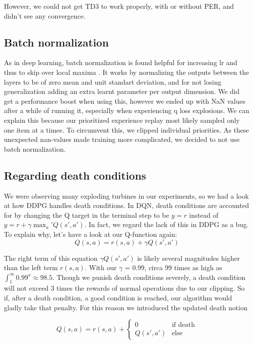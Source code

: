 \documentclass[hyperref,beleg]{cgvpub}
\begin{document}
However, we could not get \ac{TD3} to work properly, with or without \ac{PER}, and didn't see any convergence.

\subsection{Batch normalization}
As in deep learning, batch normalization is found helpful for increasing lr and thus to skip over local maxima \cite{bjorckUnderstandingBatchNormalization}. It works by normalizing the outputs between the layers to be of zero mean and unit standart deviation, and for not losing generalization adding an extra learnt parameter per output dimension. We did get a performance boost when using this, however we ended up with NaN values after a while of running it, especially when experiencing q loss explosions. We can explain this because our prioritized experience replay most likely sampled only one item at a timee. To circumvent this, we clipped individual priorities. As these unexpected nan-values made training more complicated, we decided to not use batch normalization.

\subsection{Regarding death conditions}
\label{sec:death}

We were observing many exploding turbines in our experiments, so we had a look at how \ac{DDPG} handles death conditions. In \ac{DQN}, death conditions are accounted for by changing the Q target in the terminal step to be $y = r$ instead of $y = r + \gamma \max_a' Q(s', a')$. In fact, we regard the lack of this in \ac{DDPG} as a bug. To explain why, let's have a look at our Q-function again:
\begin{equation}
Q(s,a) = r(s,a) + \gamma Q(s', a')
\end{equation}

The right term of this equation $\gamma Q(s', a')$ is likely several magnitudes higher than the left term $r(s,a)$. With our $\gamma$ = 0.99, circa 99 times as high as $\int_1^{\infty} 0.99^x \approx 98.5$. Though we punish death conditions severely, a death condition will not exceed 3 times the rewards of normal operations due to our clipping. So if, after a death condition, a good condition is reached, our algorithm would gladly take that penalty. For this reason we introduced the updated death notion

\begin{equation}
Q(s,a) = r(s,a) + \begin{cases} 0& \text{if death}\\ Q(s', a') & \text{else}\end{cases}
\end{equation}
\end{document}
